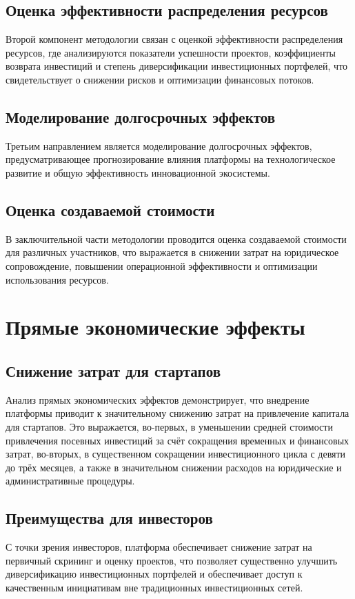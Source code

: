 \documentclass[
    candidate, %
    subf, %
    dotsinheaders=false,
]{disser}
\begin{document}
\subsection{Оценка эффективности распределения ресурсов}
Второй компонент методологии связан с оценкой эффективности распределения ресурсов, где анализируются показатели успешности проектов, коэффициенты возврата инвестиций и степень диверсификации инвестиционных портфелей, что свидетельствует о снижении рисков и оптимизации финансовых потоков.

\subsection{Моделирование долгосрочных эффектов}
Третьим направлением является моделирование долгосрочных эффектов, предусматривающее прогнозирование влияния платформы на технологическое развитие и общую эффективность инновационной экосистемы.

\subsection{Оценка создаваемой стоимости}
В заключительной части методологии проводится оценка создаваемой стоимости для различных участников, что выражается в снижении затрат на юридическое сопровождение, повышении операционной эффективности и оптимизации использования ресурсов.

\section{Прямые экономические эффекты}

\subsection{Снижение затрат для стартапов}
Анализ прямых экономических эффектов демонстрирует, что внедрение платформы приводит к значительному снижению затрат на привлечение капитала для стартапов. Это выражается, во-первых, в уменьшении средней стоимости привлечения посевных инвестиций за счёт сокращения временных и финансовых затрат, во-вторых, в существенном сокращении инвестиционного цикла с девяти до трёх месяцев, а также в значительном снижении расходов на юридические и административные процедуры.

\subsection{Преимущества для инвесторов}
С точки зрения инвесторов, платформа обеспечивает снижение затрат на первичный скрининг и оценку проектов, что позволяет существенно улучшить диверсификацию инвестиционных портфелей и обеспечивает доступ к качественным инициативам вне традиционных инвестиционных сетей.
\end{document}
